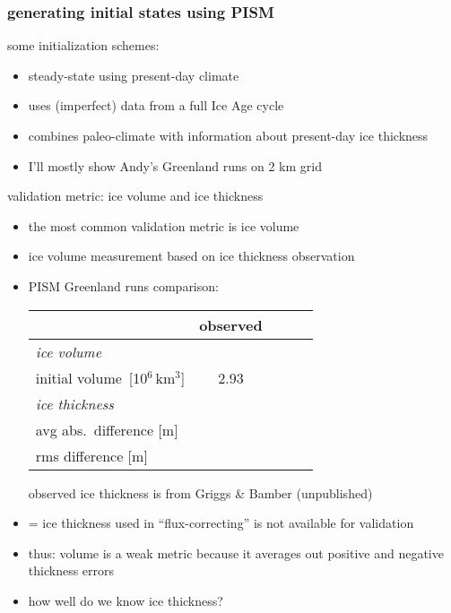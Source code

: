 \documentclass[hide notes,intlimits]{beamer}
\begin{document}
\begin{frame}
  \frametitle{generating initial states using PISM}
  \begin{block}{some initialization schemes:}
    \begin{itemize}
    \item {\color{dark blue}{constant-climate}} steady-state using
present-day climate
    \item {\color{dark orange}{paleo-climate}} uses (imperfect) data from a full Ice Age cycle
    \item {\color{dark violet}{flux-corrected paleo-climate}} combines
paleo-climate with information about present-day ice thickness
    \end{itemize}
  \end{block}

  \begin{itemize}
  \item I'll mostly show Andy's Greenland runs on 2 km grid
  \end{itemize}
\end{frame}


\begin{frame}{validation metric: ice volume and ice thickness}

\begin{itemize}
\item the most common validation metric is ice volume
\item ice volume measurement based on ice thickness observation
\item PISM Greenland runs comparison:

\vspace{1em}

{\scriptsize{
\begin{tabular}{l c c c c}
\hline
  & observed & \color{dark blue}{constant-climate} & \color{dark orange}{paleo-climate}  & \color{dark violet}{flux-corrected}\\
\hline
\emph{ice volume}\\
initial volume\, [10$^{6}$\,km$^{3}$] & 2.93 & \color{dark blue}{3.18} & \color{dark orange}{3.37} & \color{dark violet}{X} \medskip \\

\emph{ice thickness}\\
avg abs.~difference [m] &  & \color{dark blue}{99} & \color{dark orange}{121} & \color{dark violet}{X}\\
rms difference [m] & & \color{dark blue}{199} & \color{dark orange}{244} & \color{dark violet}{X}\\
\hline
\end{tabular}
observed ice thickness is from Griggs \& Bamber (unpublished)
}}
\scriptsize
\item[\color{dark violet}{X}] = ice thickness used in ``flux-correcting'' is not available for validation
\normalsize
\bigskip

\item thus: volume is a weak metric because it averages out positive and negative thickness errors
\item how well do we know ice thickness?
\end{itemize}
\end{frame}
\end{document}
